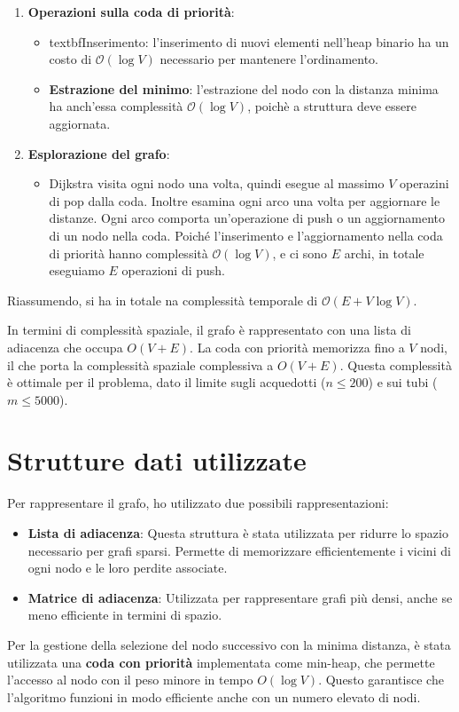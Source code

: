 \documentclass[a4paper,12pt]{article}
\begin{document}
\begin{enumerate}
    \item \textbf{Operazioni sulla coda di priorità}: 
    \begin{itemize}
        \item textbf{Inserimento}: l'inserimento di nuovi elementi nell'heap binario ha
        un costo di $\mathcal{O}(\log{V})$ necessario per mantenere l'ordinamento.
        \item \textbf{Estrazione del minimo}: l'estrazione del nodo con la distanza minima 
        ha anch'essa complessità $\mathcal{O}(\log{V})$, poichè a struttura deve essere aggiornata.
    \end{itemize}

    \item \textbf{Esplorazione del grafo}:
    \begin{itemize}
        \item Dijkstra visita ogni nodo una volta, quindi esegue al massimo $V$ operazini di pop
        dalla coda. Inoltre esamina ogni arco una volta per aggiornare le distanze.
        Ogni arco comporta un'operazione di push o un aggiornamento di un nodo nella coda. 
        Poiché l'inserimento e l'aggiornamento nella coda di priorità hanno complessità 
        $\mathcal{O}(\log{V})$, e ci sono $E$ archi, in totale eseguiamo $E$ operazioni 
        di push.
    \end{itemize}
\end{enumerate}

Riassumendo, si ha in totale na complessità temporale di $\mathcal{O}(E + V \log{V})$.

In termini di complessità spaziale, il grafo è rappresentato con una lista 
di adiacenza che occupa $O(V+E)$. La coda con priorità memorizza fino a $V$ nodi, 
il che porta la complessità spaziale complessiva a $O(V+E)$. 
Questa complessità è ottimale per il problema, dato il limite 
sugli acquedotti ($n \leq 200$) e sui tubi ($m \leq 5000$).

\section{Strutture dati utilizzate}
Per rappresentare il grafo, ho utilizzato due possibili rappresentazioni:
\begin{itemize}
    \item \textbf{Lista di adiacenza}: Questa struttura è stata utilizzata per ridurre lo 
    spazio necessario per grafi sparsi. Permette di memorizzare efficientemente i vicini di 
    ogni nodo e le loro perdite associate.
    \item \textbf{Matrice di adiacenza}: Utilizzata per rappresentare grafi più densi, anche 
    se meno efficiente in termini di spazio.
\end{itemize}

Per la gestione della selezione del nodo successivo con la minima distanza, è stata 
utilizzata una \textbf{coda con priorità} implementata come min-heap, che permette 
l'accesso al nodo con il peso minore in tempo $O(\log V)$. Questo garantisce che 
l'algoritmo funzioni in modo efficiente anche con un numero elevato di nodi.
\end{document}
